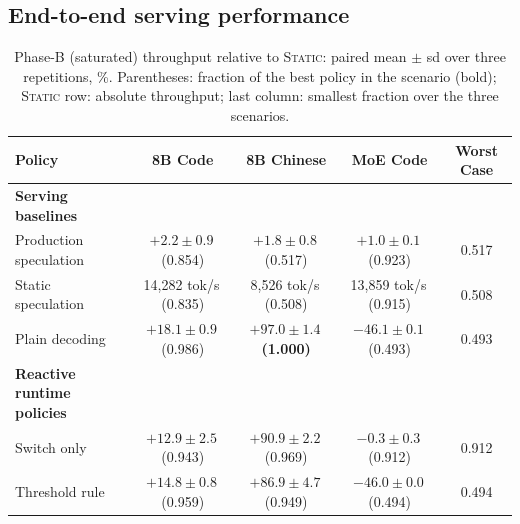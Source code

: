 \documentclass{article}
\newcommand{\pol}[1]{\textsc{#1}}
\begin{document}
\subsection{End-to-end serving performance}\label{sec:results}

\begin{table}[t]
\caption{Phase-B (saturated) throughput relative to \pol{Static}: paired mean $\pm$ sd over three repetitions, \%. Parentheses: fraction of the best policy in the scenario (bold); \pol{Static} row: absolute throughput; last column: smallest fraction over the three scenarios.}
\label{tab:main}
\centering\small

\renewcommand{\arraystretch}{1.15}
\setlength{\tabcolsep}{4pt}

\begin{tabular}{@{}lcccc@{}}
\toprule
\textbf{Policy} &
\textbf{8B Code} &
\textbf{8B Chinese} &
\textbf{MoE Code} &
\textbf{Worst Case} \\
\midrule

\rowcolor{tabGroup}
\textbf{\footnotesize Serving baselines}
& & & & \\

Production speculation
& $+2.2\pm0.9$\,{\scriptsize(0.854)}
& $+1.8\pm0.8$\,{\scriptsize(0.517)}
& $+1.0\pm0.1$\,{\scriptsize(0.923)}
& 0.517 \\

Static speculation
& 14{,}282 tok/s\,{\scriptsize(0.835)}
& 8{,}526 tok/s\,{\scriptsize(0.508)}
& 13{,}859 tok/s\,{\scriptsize(0.915)}
& 0.508 \\

Plain decoding
& $+18.1\pm0.9$\,{\scriptsize(0.986)}
& \cellcolor{tabBest}
  $\boldsymbol{+97.0\pm1.4}$\,{\scriptsize\bfseries(1.000)}
& $-46.1\pm0.1$\,{\scriptsize(0.493)}
& 0.493 \\

\addlinespace[3pt]

\rowcolor{tabGroup}
\textbf{\footnotesize Reactive runtime policies}
& & & & \\

Switch only
& $+12.9\pm2.5$\,{\scriptsize(0.943)}
& $+90.9\pm2.2$\,{\scriptsize(0.969)}
& $-0.3\pm0.3$\,{\scriptsize(0.912)}
& 0.912 \\

Threshold rule
& $+14.8\pm0.8$\,{\scriptsize(0.959)}
& $+86.9\pm4.7$\,{\scriptsize(0.949)}
& $-46.0\pm0.0$\,{\scriptsize(0.494)}
& 0.494 \\


\end{tabular}
\end{table}
\end{document}
